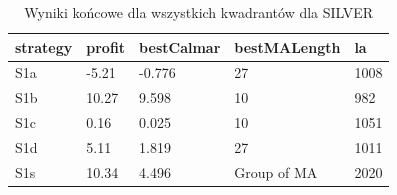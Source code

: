 \newpage
 \begin{table}[t!]
\caption{Wyniki końcowe dla wszystkich kwadrantów dla  SILVER}
 \begin{center} 
 \begin{tabular}{|l|l|l|l|l|} 
 \hline \textbf{strategy} & \textbf{profit} & \textbf{bestCalmar} & \textbf{bestMALength} & \textbf{la} \\ \hline  
S1a & -5.21 & -0.776 & 27 & 1008\\ \hline 
S1b & 10.27 & 9.598 & 10 & 982\\ \hline 
S1c & 0.16 & 0.025 & 10 & 1051\\ \hline 
S1d & 5.11 & 1.819 & 27 & 1011\\ \hline 
S1s & 10.34 & 4.496 & Group of MA & 2020\\ 
\hline \end{tabular} 
 \end{center} 
 \end{table}
\FloatBarrier
